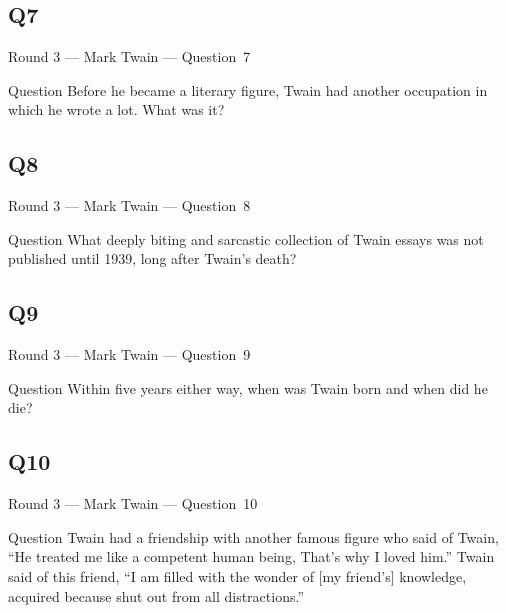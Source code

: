 \documentclass[11pt]{beamer}
\begin{document}
\subsection*{Q7}
\begin{frame}[t]{Round 3 --- Mark Twain --- \mbox{Question 7}}
\vspace{-0.5em}
\begin{block}{Question}
Before he became a literary figure, Twain had another occupation in which he wrote a lot.  What was it?
\end{block}
\end{frame}
\subsection*{Q8}
\begin{frame}[t]{Round 3 --- Mark Twain --- \mbox{Question 8}}
\vspace{-0.5em}
\begin{block}{Question}
What deeply biting and sarcastic collection of Twain essays was not published until 1939, long after Twain's death?
\end{block}
\end{frame}
\subsection*{Q9}
\begin{frame}[t]{Round 3 --- Mark Twain --- \mbox{Question 9}}
\vspace{-0.5em}
\begin{block}{Question}
Within five years either way, when was Twain born and when did he die?
\end{block}
\end{frame}
\subsection*{Q10}
\begin{frame}[t]{Round 3 --- Mark Twain --- \mbox{Question 10}}
\vspace{-0.5em}
\begin{block}{Question}
Twain had a friendship with another famous figure who said of Twain, ``He treated me like a competent human being, That's why I loved him.'' Twain said of this friend, ``I am filled with the wonder of [my friend's] knowledge, acquired because shut out from all distractions.''
\end{block}
\end{frame}
\end{document}
